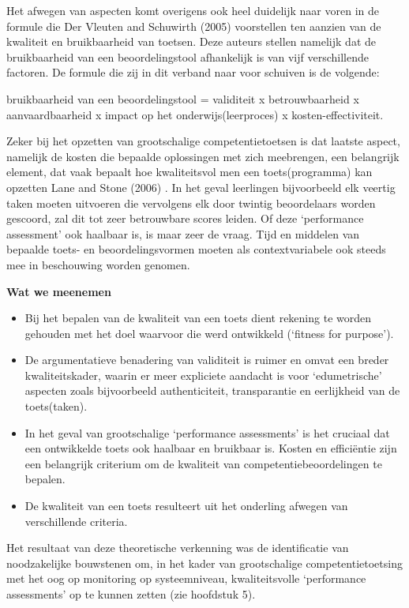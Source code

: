 \documentclass[
  letterpaper,
]{report}
\providecommand{\tightlist}{%
  \setlength{\itemsep}{0pt}\setlength{\parskip}{0pt}}
\begin{document}
Het afwegen van aspecten komt overigens ook heel duidelijk naar voren in
de formule die Der Vleuten and Schuwirth (2005) voorstellen ten aanzien
van de kwaliteit en bruikbaarheid van toetsen. Deze auteurs stellen
namelijk dat de bruikbaarheid van een beoordelingstool afhankelijk is
van vijf verschillende factoren. De formule die zij in dit verband naar
voor schuiven is de volgende:

bruikbaarheid van een beoordelingstool = validiteit x betrouwbaarheid x
aanvaardbaarheid x impact op het onderwijs(leerproces) x
kosten-effectiviteit.

Zeker bij het opzetten van grootschalige competentietoetsen is dat
laatste aspect, namelijk de kosten die bepaalde oplossingen met zich
meebrengen, een belangrijk element, dat vaak bepaalt hoe kwaliteitsvol
men een toets(programma) kan opzetten Lane and Stone (2006) . In het
geval leerlingen bijvoorbeeld elk veertig taken moeten uitvoeren die
vervolgens elk door twintig beoordelaars worden gescoord, zal dit tot
zeer betrouwbare scores leiden. Of deze `performance assessment' ook
haalbaar is, is maar zeer de vraag. Tijd en middelen van bepaalde toets-
en beoordelingsvormen moeten als contextvariabele ook steeds mee in
beschouwing worden genomen.

\textbf{Wat we meenemen}

\begin{itemize}
\tightlist
\item
  Bij het bepalen van de kwaliteit van een toets dient rekening te
  worden gehouden met het doel waarvoor die werd ontwikkeld (`fitness
  for purpose').
\item
  De argumentatieve benadering van validiteit is ruimer en omvat een
  breder kwaliteitskader, waarin er meer expliciete aandacht is voor
  `edumetrische' aspecten zoals bijvoorbeeld authenticiteit,
  transparantie en eerlijkheid van de toets(taken).
\item
  In het geval van grootschalige `performance assessments' is het
  cruciaal dat een ontwikkelde toets ook haalbaar en bruikbaar is.
  Kosten en efficiëntie zijn een belangrijk criterium om de kwaliteit
  van competentiebeoordelingen te bepalen.
\item
  De kwaliteit van een toets resulteert uit het onderling afwegen van
  verschillende criteria.
\end{itemize}

Het resultaat van deze theoretische verkenning was de identificatie van
noodzakelijke bouwstenen om, in het kader van grootschalige
competentietoetsing met het oog op monitoring op systeemniveau,
kwaliteitsvolle `performance assessments' op te kunnen zetten (zie
hoofdstuk 5).
\end{document}
